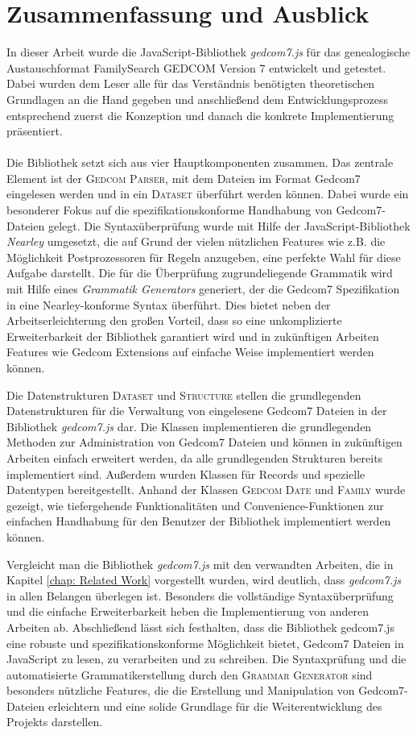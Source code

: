 \chapter{Zusammenfassung und Ausblick}
\label{chap: Zusammenfassung und Ausblick}
In dieser Arbeit wurde die JavaScript-Bibliothek \textit{gedcom7.js} für das genealogische Austauschformat FamilySearch GEDCOM Version 7 entwickelt und getestet. Dabei wurden dem Leser alle für das Verständnis benötigten theoretischen Grundlagen an die Hand gegeben und anschließend dem Entwicklungsprozess entsprechend zuerst die Konzeption und danach die konkrete Implementierung präsentiert. 
\\ \\
Die Bibliothek setzt sich aus vier Hauptkomponenten zusammen. Das zentrale Element ist der \textsc{Gedcom Parser}, mit dem Dateien im Format Gedcom7 eingelesen werden und in ein \textsc{Dataset} überführt werden können.
Dabei wurde ein besonderer Fokus auf die spezifikationskonforme Handhabung von Gedcom7-Dateien gelegt. Die Syntaxüberprüfung wurde mit Hilfe der JavaScript-Bibliothek \textit{Nearley} umgesetzt, die auf Grund der vielen nützlichen Features wie z.B. die Möglichkeit Postprozessoren für Regeln anzugeben, eine perfekte Wahl für diese Aufgabe darstellt. Die für die Überprüfung zugrundeliegende Grammatik wird mit Hilfe eines \textit{Grammatik Generators} generiert, der die Gedcom7 Spezifikation in eine Nearley-konforme Syntax überführt. Dies bietet neben der Arbeitserleichterung den großen Vorteil, dass so eine unkomplizierte Erweiterbarkeit der Bibliothek garantiert wird und in zukünftigen Arbeiten Features wie Gedcom Extensions auf einfache Weise implementiert werden können. 


Die Datenstrukturen \textsc{Dataset} und \textsc{Structure} stellen die grundlegenden Datenstrukturen für die Verwaltung von eingelesene Gedcom7 Dateien in der Bibliothek \textit{gedcom7.js} dar. Die Klassen implementieren die grundlegenden Methoden zur Administration von Gedcom7 Dateien und können in zukünftigen Arbeiten einfach erweitert werden, da alle grundlegenden Strukturen bereits implementiert sind. Außerdem wurden Klassen für Records und spezielle Datentypen bereitgestellt. Anhand der Klassen \textsc{Gedcom Date} und \textsc{Family} wurde gezeigt, wie tiefergehende Funktionalitäten und Convenience-Funktionen zur einfachen Handhabung für den Benutzer der Bibliothek implementiert werden können. 


Vergleicht man die Bibliothek \textit{gedcom7.js} mit den verwandten Arbeiten, die in Kapitel \ref{chap: Related Work} vorgestellt wurden, wird deutlich, dass \textit{gedcom7.js} in allen Belangen überlegen ist. Besonders die vollständige Syntaxüberprüfung und die einfache Erweiterbarkeit heben die Implementierung von anderen Arbeiten ab. 
\newpage
{
\noindent
Abschließend lässt sich festhalten, dass die Bibliothek gedcom7.js eine robuste und spezifikationskonforme Möglichkeit bietet, Gedcom7 Dateien in JavaScript zu lesen, zu verarbeiten und zu schreiben. Die Syntaxprüfung und die automatisierte Grammatikerstellung durch den \textsc{Grammar Generator} sind besonders nützliche Features, die die Erstellung und Manipulation von Gedcom7-Dateien erleichtern und eine solide Grundlage für die Weiterentwicklung des Projekts darstellen.
}